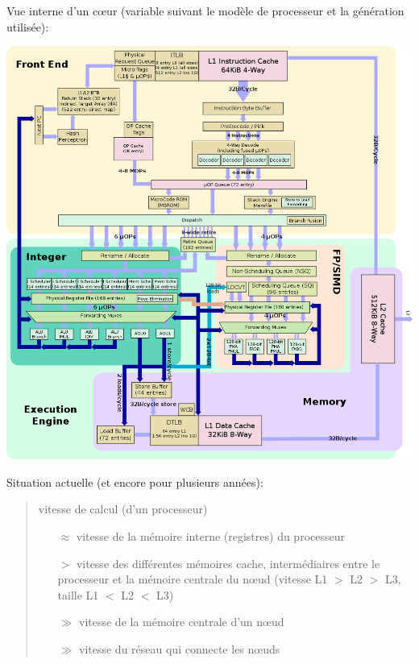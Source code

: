 \documentclass{beamer}
\begin{document}
\begin{frame}
Vue interne d'un c\oe ur (variable suivant le mod\`ele de processeur et la g\'en\'eration utilis\'ee):

\begin{center}
	\includegraphics[scale=0.2]{1106px-zen_block_diagram}
\end{center}

\end{frame}

\begin{frame}[fragile]
Situation actuelle (et encore pour plusieurs ann\'ees): 
\begin{quote}
	
	\vfill
	vitesse de calcul (d'un processeur)
	\vfill
	
	\begin{itemize}
		\item[$\approx$] vitesse de la m\'emoire interne (registres) du processeur
			\medskip
	        
		\item[$>$] vitesse des diff\'erentes m\'emoires cache, interm\'ediaires entre le processeur et la m\'emoire centrale du n\oe ud (vitesse L1 $>$ L2 $>$ L3, taille L1 $<$ L2 $<$ L3)
			\medskip
			
		\item[$\gg$] vitesse de la m\'emoire centrale d'un n\oe ud
			\medskip
			
		\item[$\gg$] vitesse du r\'eseau qui connecte les n\oe uds
	\end{itemize}


\end{quote}

\end{frame}
\end{document}
